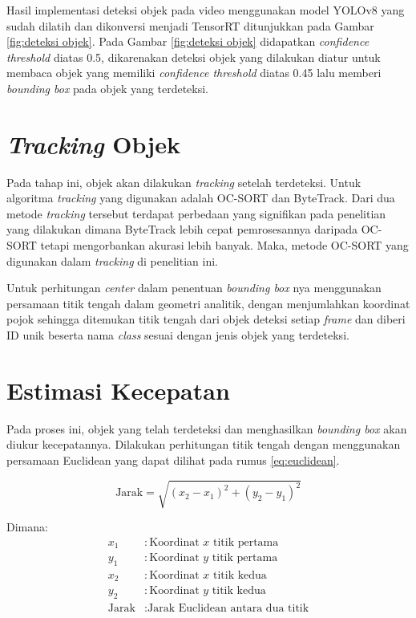 Hasil implementasi deteksi objek pada video menggunakan model YOLOv8 yang sudah dilatih dan dikonversi menjadi TensorRT ditunjukkan pada Gambar \ref{fig:deteksi objek}. Pada Gambar \ref{fig:deteksi objek} didapatkan \emph{confidence threshold} diatas 0.5, dikarenakan deteksi objek yang dilakukan diatur untuk membaca objek yang memiliki \emph{confidence threshold} diatas 0.45 lalu memberi \emph{bounding box} pada objek yang terdeteksi.

\section{\emph{Tracking} Objek}
Pada tahap ini, objek akan dilakukan \emph{tracking} setelah terdeteksi. Untuk algoritma \emph{tracking} yang digunakan adalah OC-SORT dan ByteTrack. Dari dua metode \emph{tracking} tersebut terdapat perbedaan yang signifikan pada penelitian yang dilakukan dimana ByteTrack lebih cepat pemrosesannya daripada OC-SORT tetapi mengorbankan akurasi lebih banyak. Maka, metode OC-SORT yang digunakan dalam \emph{tracking} di penelitian ini.

Untuk perhitungan \emph{center} dalam penentuan \emph{bounding box} nya menggunakan persamaan titik tengah dalam geometri analitik, dengan menjumlahkan koordinat pojok sehingga ditemukan titik tengah dari objek deteksi setiap \emph{frame} dan diberi ID unik beserta nama \emph{class} sesuai dengan jenis objek yang terdeteksi.

\section{Estimasi Kecepatan}
Pada proses ini, objek yang telah terdeteksi dan menghasilkan \emph{bounding box} akan diukur kecepatannya. Dilakukan perhitungan titik tengah dengan menggunakan persamaan Euclidean yang dapat dilihat pada rumus \ref{eq:euclidean}.

\begin{equation}
  \label{eq:euclidean}
  \text{Jarak} = \sqrt{(x_2 - x_1)^2 + (y_2 - y_1)^2}
\end{equation}

\begin{flushleft}
Dimana:
\begin{align*}
x_1 & : \text{Koordinat $x$ titik pertama} \\
y_1 & : \text{Koordinat $y$ titik pertama} \\
x_2 & : \text{Koordinat $x$ titik kedua} \\
y_2 & : \text{Koordinat $y$ titik kedua} \\
\text{Jarak} & : \text{Jarak Euclidean antara dua titik}
\end{align*}
\end{flushleft}

